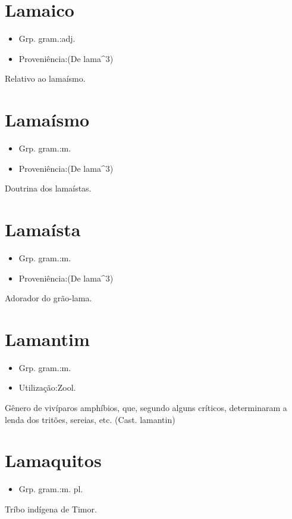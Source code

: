 \section{Lamaico}
\begin{itemize}
\item {Grp. gram.:adj.}
\end{itemize}
\begin{itemize}
\item {Proveniência:(De \textunderscore lama\textunderscore ^3)}
\end{itemize}
Relativo ao lamaísmo.
\section{Lamaísmo}
\begin{itemize}
\item {Grp. gram.:m.}
\end{itemize}
\begin{itemize}
\item {Proveniência:(De \textunderscore lama\textunderscore ^3)}
\end{itemize}
Doutrina dos lamaístas.
\section{Lamaísta}
\begin{itemize}
\item {Grp. gram.:m.}
\end{itemize}
\begin{itemize}
\item {Proveniência:(De \textunderscore lama\textunderscore ^3)}
\end{itemize}
Adorador do grão-lama.
\section{Lamantim}
\begin{itemize}
\item {Grp. gram.:m.}
\end{itemize}
\begin{itemize}
\item {Utilização:Zool.}
\end{itemize}
Gênero de vivíparos amphíbios, que, segundo alguns críticos, determinaram a lenda dos tritões, sereias, etc.
(Cast. \textunderscore lamantin\textunderscore )
\section{Lamaquitos}
\begin{itemize}
\item {Grp. gram.:m. pl.}
\end{itemize}
Tríbo indígena de Timor.
